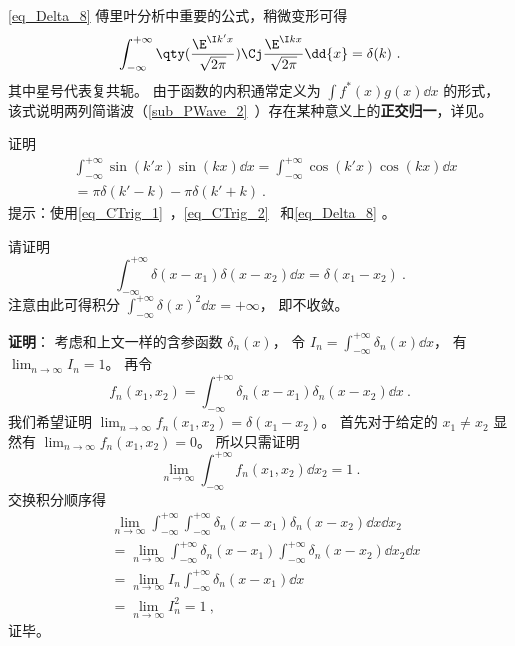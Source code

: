 \autoref{eq_Delta_8} 傅里叶分析中重要的公式，稍微变形可得
\begin{equation}
\int_{-\infty}^{+\infty} \qty(\frac{\E^{\I k'x}}{\sqrt{2\pi}})\Cj \frac{\E^{\I kx}}{\sqrt{2\pi}}\dd{x} = \delta(k)~.
\end{equation}
其中星号代表复共轭。 由于函数的内积通常定义为 $\int f^*(x) g(x) \dd{x}$ 的形式， 该式说明两列简谐波（\autoref{sub_PWave_2}~）存在某种意义上的\textbf{正交归一}，详见。

\begin{exercise}{}\label{exe_Delta_3}
证明
\begin{equation}\label{eq_Delta_9}
\begin{aligned}%
&\int_{-\infty}^{+\infty} \sin(k'x) \sin(kx) \dd{x} = \int_{-\infty}^{+\infty} \cos(k'x) \cos(kx) \dd{x}\\
&= \pi\delta(k' - k) - \pi\delta(k' + k)~.
\end{aligned}
\end{equation}
提示：使用\autoref{eq_CTrig_1}~，\autoref{eq_CTrig_2}~ 和\autoref{eq_Delta_8} 。
\end{exercise}

\begin{example}{}
请证明
\begin{equation}\label{eq_Delta_13}
\int_{-\infty}^{+\infty} \delta(x-x_1) \delta(x-x_2) \dd{x} = \delta(x_1 - x_2)~.
\end{equation}
注意由此可得积分 $\int_{-\infty}^{+\infty}\delta(x)^2 \dd{x} = +\infty$， 即不收敛。

\textbf{证明}： 考虑和上文一样的含参函数 $\delta_n(x)$， 令 $I_n = \int_{-\infty}^{+\infty} \delta_n(x) \dd{x}$， 有 $\lim_{n\to\infty} I_n = 1$。 再令
\begin{equation}
f_n(x_1, x_2) = \int_{-\infty}^{+\infty} \delta_n(x-x_1) \delta_n(x-x_2) \dd{x}~.
\end{equation}
我们希望证明 $\lim_{n\to\infty }f_n(x_1, x_2) = \delta(x_1 - x_2)$。 首先对于给定的 $x_1 \ne x_2$ 显然有 $\lim_{n\to\infty }f_n(x_1, x_2) = 0$。 所以只需证明
\begin{equation}
\lim_{n\to\infty }\int_{-\infty}^{+\infty} f_n(x_1, x_2) \dd{x_2} = 1~.
\end{equation}
交换积分顺序得
\begin{equation}
\begin{aligned}
&\lim_{n\to\infty }\int_{-\infty}^{+\infty}\int_{-\infty}^{+\infty} \delta_n(x-x_1) \delta_n(x-x_2) \dd{x}\dd{x_2}\\
&= \lim_{n\to\infty }\int_{-\infty}^{+\infty} \delta_n(x-x_1) \int_{-\infty}^{+\infty} \delta_n(x-x_2)\dd{x_2} \dd{x}\\
&= \lim_{n\to\infty } I_n \int_{-\infty}^{+\infty} \delta_n(x-x_1)\dd{x}\\
&= \lim_{n\to\infty } I_n^2 = 1~,
\end{aligned}
\end{equation}
证毕。
\end{example}
